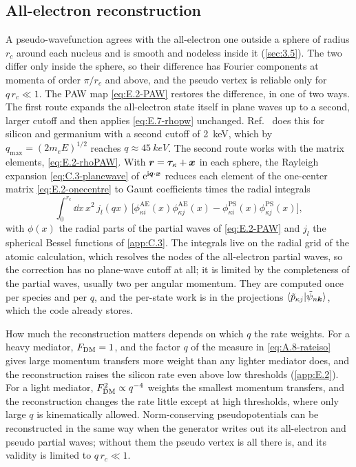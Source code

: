 \subsection{All-electron reconstruction}

A pseudo-wavefunction agrees with the all-electron one outside a sphere of radius $r_c$ around each nucleus and is smooth and nodeless inside it (\cref{sec:3.5}). The two differ only inside the sphere, so their difference has Fourier components at momenta of order $\pi/r_c$ and above, and the pseudo vertex is reliable only for $q\,r_c \ll 1$. The PAW map \cref{eq:E.2-PAW} restores the difference, in one of two ways. The first route expands the all-electron state itself in plane waves up to a second, larger cutoff and then applies \cref{eq:E.7-rhopw} unchanged. Ref.~\cite[Sect.~2.1.1]{griffin2021extended} does this for silicon and germanium with a second cutoff of \SI{2}{keV}, which by $q_{\mathrm{max}} = (2m_eE)^{1/2}$ reaches $q \approx \SI{45}{keV}$. The second route works with the matrix elements, \cref{eq:E.2-rhoPAW}. With $\bm{r} = \bm{\tau}_\kappa + \bm{x}$ in each sphere, the Rayleigh expansion \cref{eq:C.3-planewave} of $\mathrm{e}^{\mathrm{i}\bm{q}\cdot\bm{x}}$ reduces each element of the one-center matrix \cref{eq:E.2-onecentre} to Gaunt coefficients times the radial integrals
\begin{equation}
  \int_0^{r_c}\dd x\,x^2\,j_l(qx)\,\bigl[\phi^{\mathrm{AE}}_{\kappa i}(x)\phi^{\mathrm{AE}}_{\kappa j}(x) - \phi^{\mathrm{PS}}_{\kappa i}(x)\phi^{\mathrm{PS}}_{\kappa j}(x)\bigr] ,
  \label{eq:E.7-radial}
\end{equation}
with $\phi(x)$ the radial parts of the partial waves of \cref{eq:E.2-PAW} and $j_l$ the spherical Bessel functions of \cref{app:C.3}. The integrals live on the radial grid of the atomic calculation, which resolves the nodes of the all-electron partial waves, so the correction has no plane-wave cutoff at all; it is limited by the completeness of the partial waves, usually two per angular momentum. They are computed once per species and per $q$, and the per-state work is in the projections $\langle\tilde p_{\kappa j}|\tilde\psi_{n\bm{k}}\rangle$, which the code already stores.

How much the reconstruction matters depends on which $q$ the rate weights. For a heavy mediator, $F_{\mathrm{DM}} = 1$, and the factor $q$ of the measure in \cref{eq:A.8-rateiso} gives large momentum transfers more weight than any lighter mediator does, and the reconstruction raises the silicon rate even above low thresholds (\cref{app:E.2}). For a light mediator, $F_{\mathrm{DM}}^2 \propto q^{-4}$ weights the smallest momentum transfers, and the reconstruction changes the rate little except at high thresholds, where only large $q$ is kinematically allowed. Norm-conserving pseudopotentials can be reconstructed in the same way when the generator writes out its all-electron and pseudo partial waves; without them the pseudo vertex is all there is, and its validity is limited to $q\,r_c \ll 1$.

